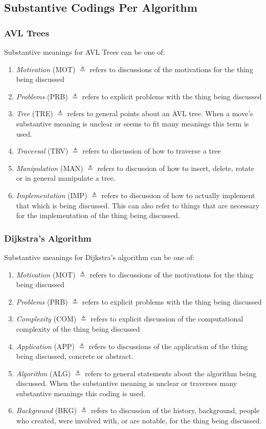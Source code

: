 \documentclass[10pt, letterpaper]{article}
\begin{document}
\begin{enumerate}
\end{enumerate}

\subsection*{Substantive Codings Per Algorithm}
\label{sec:orge9f1d47}

\subsubsection*{AVL Trees}
\label{sec:org0417910}
Substantive meanings for AVL Trees can be one of:
\begin{enumerate}
\item \emph{Motivation} (MOT) \(\triangleq\) refers to discussions of the motivations for the thing being discussed
\item \emph{Problems} (PRB) \(\triangleq\) refers to explicit problems with the thing being discussed
\item \emph{Tree} (TRE) \(\triangleq\) refers to general points about an AVL tree. When a move's substantive meaning is unclear or seems to fit many meanings this term is used.
\item \emph{Traversal} (TRV) \(\triangleq\) refers to discussion of how to traverse a tree
\item \emph{Manipulation} (MAN) \(\triangleq\) refers to discussion of how to insert, delete, rotate or in general manipulate a tree.
\item \emph{Implementation} (IMP) \(\triangleq\) refers to discussion of how to actually implement that which is being discussed. This can also refer to things that are necessary for the implementation of the thing being discussed.
\end{enumerate}
\subsubsection*{Dijkstra's Algorithm}
\label{sec:org125b204}
Substantive meanings for Dijkstra's algorithm can be one of:
\begin{enumerate}
\item \emph{Motivation} (MOT) \(\triangleq\) refers to discussions of the motivations for the thing being discussed
\item \emph{Problems} (PRB) \(\triangleq\) refers to explicit problems with the thing being discussed
\item \emph{Complexity} (COM) \(\triangleq\) refers to explicit discussion of the computational complexity of the thing being discussed
\item \emph{Application} (APP) \(\triangleq\) refers to discussions of the application of the thing being discussed, concrete or abstract.
\item \emph{Algorithm} (ALG) \(\triangleq\) refers to general statements about the algorithm being discussed. When the substantive meaning is unclear or traverses many substantive meanings this coding is used.
\item \emph{Background} (BKG) \(\triangleq\) refers to discussion of the history, background, people who created, were involved with, or are notable, for the thing being discussed.
\end{enumerate}
\end{document}
